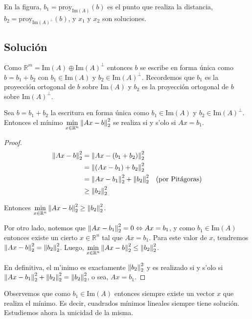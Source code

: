 En la figura, $b_1 = \text{proy}_{\text{Im}(A)}(b)$ es el punto que realiza la distancia, $b_2 = \text{proy}_{\text{Im}(A)^{\perp}}(b)$, y $x_1$ y $x_2$ son soluciones.

\subsection{Solución}

Como $\mathbb{R}^m = \text{Im}(A) \oplus \text{Im}(A)^{\perp}$ entonces $b$ se escribe en forma única como $b = b_1 + b_2$ con $b_1 \in \text{Im}(A)$ y $b_2 \in \text{Im}(A)^{\perp}$. Recordemos que $b_1$ es la proyección ortogonal de $b$ sobre $\text{Im}(A)$ y $b_2$ es la proyección ortogonal de $b$ sobre $\text{Im}(A)^{\perp}$.

\begin{propo}
Sea $b = b_1 + b_2$ la escritura en forma única como $b_1 \in \text{Im}(A)$ y $b_2 \in \text{Im}(A)^{\perp}$. Entonces el mínimo $\min\limits_{x \in  \mathbb{R}^n}\left\lVert Ax - b\right\rVert_2^2$ se realiza si y s'olo si $Ax = b_1$.

\begin{proof}
\begin{align*}
\left\lVert Ax - b\right\rVert_2^2 &= \left\lVert Ax - (b_1 + b_2)\right\rVert_2^2				&\\
				&= \left\lVert(Ax - b_1) + b_2\right\rVert_2^2				&\\
				&= \left\lVert Ax - b_1\right\rVert_2^2 + \left\lVert b_2\right\rVert_2^2		&\text{(por Pitágoras)}\\
				&\geq \left\lVert b_2\right\rVert_2^2
\end{align*}

Entonces $\min\limits_{x \in  \mathbb{R}^n}\left\lVert Ax - b\right\rVert_2^2 \geq \left\lVert b_2\right\rVert_2^2$.

Por otro lado, notemos que $\left\lVert Ax - b_1\right\rVert_2^2 = 0 \Leftrightarrow Ax = b_1$, y como $b_1 \in \text{Im}(A)$ entonces existe un cierto $x \in \mathbb{R}^n$ tal que $Ax = b_1$. Para este valor de $x$, tendremos $\left\lVert Ax - b\right\rVert_2^2 = \left\lVert b_2\right\rVert_2^2$. Luego, $\min\limits_{x \in  \mathbb{R}^n}\left\lVert Ax - b\right\rVert_2^2 \leq \left\lVert b_2\right\rVert_2^2$.

En definitiva, el m'inimo es exactamente $\left\lVert b_2\right\rVert_2^2$ y es realizado si y s'olo si $\left\lVert Ax - b_1\right\rVert_2^2 + \left\lVert b_2\right\rVert_2^2 = \left\lVert b_2\right\rVert_2^2$, o sea, $Ax = b_1$.

\end{proof}
\end{propo}

Observemos que como $b_1 \in \text{Im}(A)$ entonces siempre existe un vector $x$ que realiza el mínimo. Es decir, cuadrados mínimos lineales siempre tiene solución. Estudiemos ahora la unicidad de la misma.


